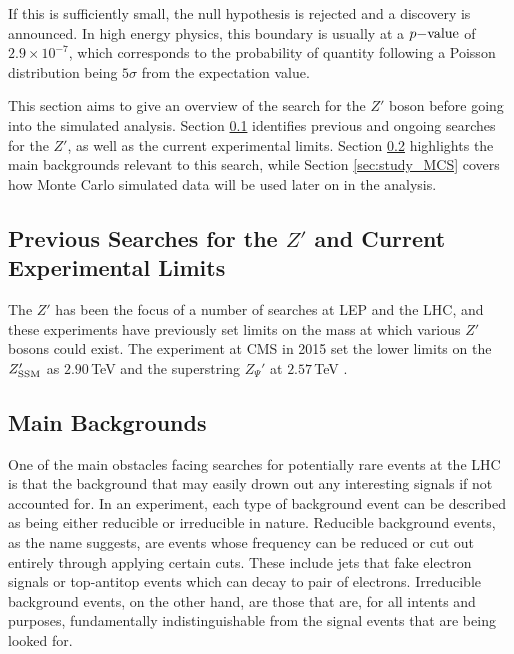 \documentclass{article}
\begin{document}
If this is sufficiently small, the null hypothesis is rejected and a discovery is announced. In high energy physics, this boundary is usually at a $p\rm{-value}$ of $2.9\times10^{-7}$, which corresponds to the probability of quantity following a Poisson distribution being $5\sigma$ from the expectation value.

This section aims to give an overview of the search for the $Z'$ boson before going into the simulated analysis. Section \ref{sec:study_previousLimits} identifies previous and ongoing searches for the $Z'$, as well as the current experimental limits. Section \ref{sec:study_mainBackgrounds} highlights the main backgrounds relevant to this search, while Section \ref{sec:study_MCS} covers how Monte Carlo simulated data will be used later on in the analysis.

\subsection{Previous Searches for the $Z'$ and Current Experimental Limits}%
\label{sec:study_previousLimits}


The $Z'$ has been the focus of a number of searches at LEP and the LHC, and these experiments have previously set limits on the mass at which various $Z'$ bosons could exist. The experiment at CMS in 2015 set the lower limits on the $Z_{\rm{SSM}}'$ as $2.90\,$TeV and the superstring $Z_{\Psi}'$ at $2.57\,$TeV \cite{CMSDileptonSearch}. 

\subsection{Main Backgrounds}%
\label{sec:study_mainBackgrounds}

One of the main obstacles facing searches for potentially rare events at the LHC is that the background that may easily drown out any interesting signals if not accounted for. In an experiment, each type of background event can be described as being either reducible or irreducible in nature. Reducible background events, as the name suggests, are events whose frequency can be reduced or cut out entirely through applying certain cuts. These include jets that fake electron signals or top-antitop events which can decay to pair of electrons. Irreducible background events, on the other hand, are those that are, for all intents and purposes, fundamentally indistinguishable from the signal events that are being looked for. 
\end{document}
